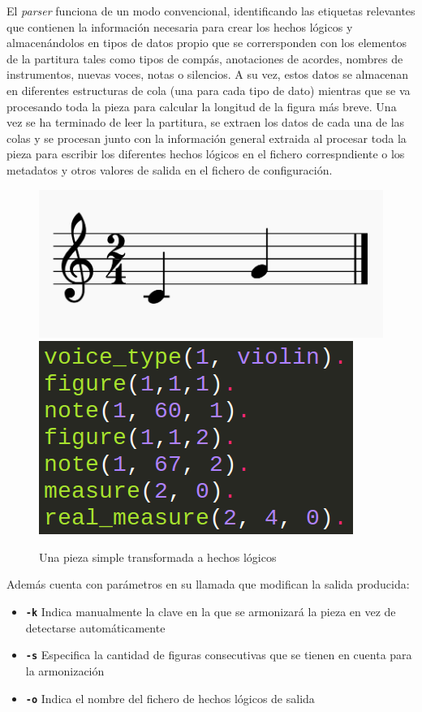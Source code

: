 El \textit{parser} funciona de un modo convencional, identificando las etiquetas relevantes que contienen la información necesaria para crear los hechos lógicos y almacenándolos en tipos de datos propio que se corrersponden con los elementos de la partitura tales como tipos de compás, anotaciones de acordes, nombres de instrumentos, nuevas voces, notas o silencios. A su vez, estos datos se almacenan en diferentes estructuras de cola (una para cada tipo de dato) mientras que se va procesando toda la pieza para calcular la longitud de la figura más breve. Una vez se ha terminado de leer la partitura, se extraen los datos de cada una de las colas y se procesan junto con la información general extraida al procesar toda la pieza para escribir los diferentes hechos lógicos en el fichero correspndiente o los metadatos y otros valores de salida en el fichero de configuración.

\begin{figure}[h]
	\centering
	\includegraphics[width=0.4\linewidth]{imagenes/example_notes.png}
	\includegraphics[width=0.4\linewidth]{imagenes/logic_facts_score.png}
	\caption{Una pieza simple transformada a hechos lógicos}
	\label{fig:simple-piece-facts}
\end{figure}

Además cuenta con parámetros en su llamada que modifican la salida producida:
\begin{itemize}
	\item \textbf{\texttt{-k}} Indica manualmente la clave en la que se armonizará la pieza en vez de detectarse automáticamente
	\item \textbf{\texttt{-s}} Especifica la cantidad de figuras consecutivas que se tienen en cuenta para la armonización
	\item \textbf{\texttt{-o}} Indica el nombre del fichero de hechos lógicos de salida	
\end{itemize}

